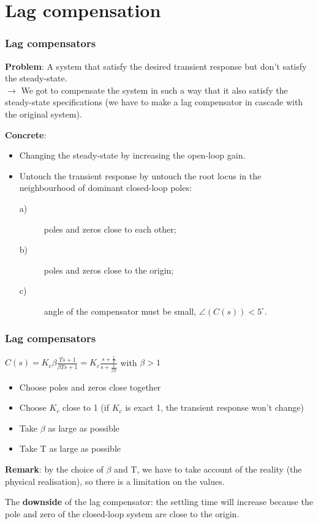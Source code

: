 \section{Lag compensation}

\begin{frame}
	\frametitle{Lag compensators}
		 \textbf{Problem}: A system that satisfy the desired transient response but don't satisfy the steady-state. \\
		 $\rightarrow$ We got to compensate the system in such a way that it also satisfy the steady-state specifications (we have to make a lag compensator in cascade with the original system).
		 \vspace{4mm}
		  
		 \textbf{Concrete}:
		 \begin{itemize}
		 	\item Changing the steady-state by increasing the open-loop gain.
		 	\item Untouch the transient response by untouch the root locus in the neighbourhood of dominant closed-loop poles:
		 	\begin{description}
		 		\item [a)] poles and zeros close to each other;
		 		\item [b)] poles and zeros close to the origin;
		 		\item [c)] angle of the compensator must be small, $\angle(C(s))<5^{\circ}$.
		 	\end{description}
		 \end{itemize}
\end{frame}

\begin{frame}
	\frametitle{Lag compensators}
		$C(s)=K_c \beta\frac{Ts+1}{\beta Ts+1}= K_c\frac{s+\frac{1}{T}}{s+\frac{1}{\beta T}}$ with $\beta>1$\\
		\begin{itemize}
			\item Choose poles and zeros close together
			\item Choose $K_c$ close to 1 (if $K_c$ is exact 1, the transient response won't change)
			\item Take $\beta$ as large as possible
			\item Take T as large as possible 
		\end{itemize}
		\vspace{3mm}
		
		\textbf{Remark}: by the choice of $\beta$ and T, we have to take account of the reality (the physical realisation), so there is a limitation on the values.  \vspace{3mm}
		
		The \textbf{downside} of the lag compensator: the settling time will increase because the pole and zero of the closed-loop system are close to the origin. 
\end{frame}

